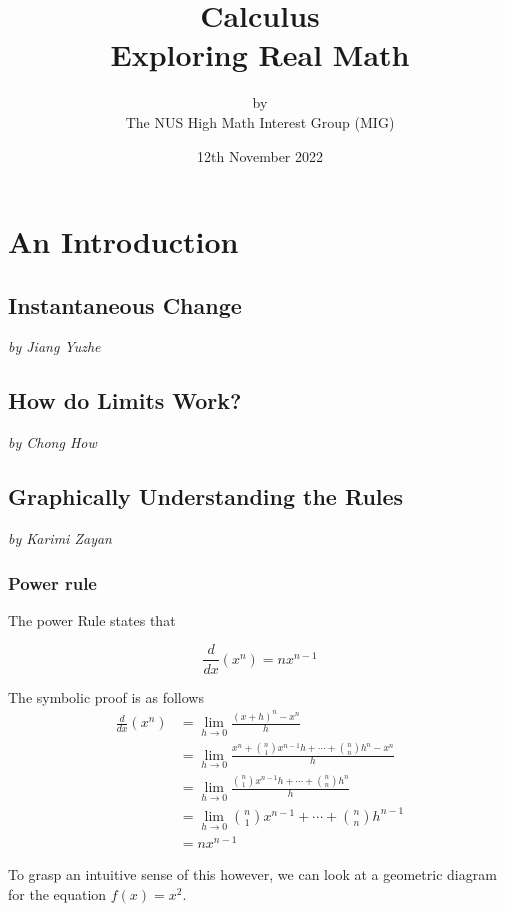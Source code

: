 \documentclass[a4paper,12pt,oneside]{book}
\title{%
  \Huge Calculus \\
  \LARGE  Exploring \textbf{Real} Math
  }
\author{by \\
\Large The NUS High Math Interest Group (MIG) \\
}
\date{\Large 12th November 2022}
\begin{document}
\maketitle

\tableofcontents

\part{An Introduction}

\newpage
\chapter{Instantaneous Change}
\vspace{-30pt}
\large \textit{by Jiang Yuzhe}


\newpage
\chapter{How do Limits Work?}
\vspace{-30pt}
\large \textit{by Chong How}


\newpage
\chapter{Graphically Understanding the Rules}
\vspace{-30pt}
\large \textit{by Karimi Zayan}

\section{Power rule}

The power Rule states that

$$\frac{d}{dx}(x^n)=nx^{n-1}$$

 \noindent The symbolic proof is as follows
$$
\begin{aligned}
\frac{d}{dx}(x^n)&=\lim_{h\to 0}\frac{(x+h)^n-x^n}{h}\\
&=\lim_{h\to 0}\frac{x^n+\binom{n}{1}x^{n-1}h+\cdots +\binom{n}{n}h^n-x^n}{h}\\
&=\lim_{h\to 0}\frac{\binom{n}{1}x^{n-1}h+\cdots +\binom{n}{n}h^n}{h}\\
&=\lim_{h\to 0}\binom{n}{1}x^{n-1}+\cdots +\binom{n}{n}h^{n-1}\\
&=nx^{n-1}
\end{aligned}
$$

 \noindent To grasp an intuitive sense of this however, we can look at a geometric diagram for the equation $f(x)=x^2$.
\end{document}
